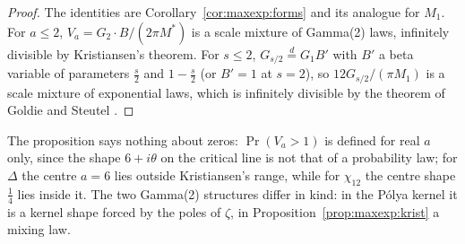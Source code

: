 \begin{proof}
The identities are Corollary~\ref{cor:maxexp:forms} and its analogue for $M_1$. For $a\le2$, $V_a=G_2\cdot B/(2\pi M^*)$ is a scale mixture of Gamma(2) laws, infinitely divisible by Kristiansen's theorem. For $s\le2$, $G_{s/2}\overset d=G_1B'$ with $B'$ a beta variable of parameters $\frac s2$ and $1-\frac s2$ (or $B'=1$ at $s=2$), so $12G_{s/2}/(\pi M_1)$ is a scale mixture of exponential laws, which is infinitely divisible by the theorem of Goldie and Steutel \cite{Goldie67,Steutel67}.
\end{proof}

The proposition says nothing about zeros: $\Pr(V_a>1)$ is defined for real $a$ only, since the shape $6+i\theta$ on the critical line is not that of a probability law; for $\Delta$ the centre $a=6$ lies outside Kristiansen's range, while for $\chi_{12}$ the centre shape $\frac14$ lies inside it. The two Gamma(2) structures differ in kind: in the P\'olya kernel it is a kernel shape forced by the poles of $\zeta$, in Proposition~\ref{prop:maxexp:krist} a mixing law.


